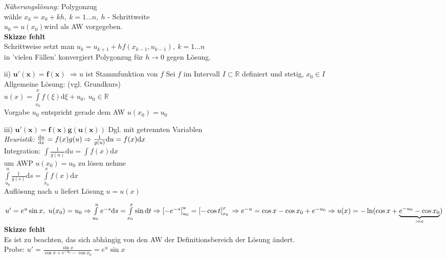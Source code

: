 \begin{enumerate}
        \emph{Näherungslösung:} Polygonzug\\
        wähle $x_k = x_0 + k h, \ k= 1 \ldots n, \ h$ - Schrittweite\\
        $u_0 = u(x_0) $wird als AW vorgegeben.\\
        \textbf{Skizze fehlt}\\
        Schrittweise setzt man $u_k = u_{k+1} + h f(x_{k-1}, u_{k-1}), \ k= 1 \ldots n $\\
        in 'vielen Fällen' konvergiert Polygonzug für $h \rightarrow 0 $ gegen Lösung.
    \item[ii)]$\mathbf{u'(x) = f(x)}$
        $\Rightarrow  u $ ist Stammfunktion von $f$
        Sei $f$ im Intervall $I \subset \mathbb{R} $ definiert und stetig, $x_0 \in I $\\
        Allgemeine Lösung: (vgl. Grundkurs)\\
        $u(x) = \int\limits_{x_0}^x f(\xi) \mathrm{d}\xi + u_0, \ u_0 \in \mathbb{R} $\\
        Vorgabe $u_0$ entspricht gerade dem AW $u(x_0) = u_0 $
    \item[iii)]$\mathbf{u'(x) = f(x) g(u(x))} $ Dgl. mit getrennten Variablen\\
        \emph{Heuristik:}
        $\frac{\mathrm{d}{u}}{\mathrm{d}{x}} = f(x) g(u) 
        \Rightarrow  \frac{1}{g(u)} \mathrm{d}u = f(x) \mathrm{d}x $\\
        Integration: $\int \frac{1}{g(u)} \mathrm{d}u = \int f(x) \mathrm{d}x $\\
        um AWP $u(x_0) = u_0 $ zu lösen nehme \\
        $\int\limits_{u_0}^u \frac{1}{g(s)} \mathrm{d}s 
        = \int\limits_{x_0}^x f(x) \mathrm{d}x $\\
        Auflösung nach $u$ liefert Lösung $u = u(x)$
        \begin{beispiel*}
        $u' = e^u \sin x, \ u(x_0) = u_0 \\
        \Rightarrow \int\limits_{u_0}^u e^{-s} \mathrm{d}s
        = \int\limits_{x_0}^x \sin \mathrm{d}t
        \Rightarrow \left[ -e^{-s} \right]_{u_0}^u = \left[ - \cos t \right]_{x_0}^x \\
        \Rightarrow e^{-u} = \cos x - \cos x_0 + e^{-u_0}
        \Rightarrow u(x) = -\ln ( \cos x 
        + \underbrace{e^{-u_0} - \cos x_0}_{\coloneqq c})\\
        $        
        \textbf{Skizze fehlt}\\
        Es ist zu beachten, das sich abhängig von den AW der Definitionsbereich der
        Lösung ändert.\\
        Probe: $u' = 
        \frac{
        \sin x}
        {\cos x + e^{-u_0} - \cos x_0}
        = e^u \sin x
        $
        \end{beispiel*}        
\end{enumerate}